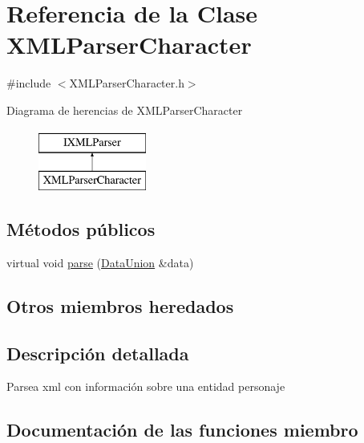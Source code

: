 \hypertarget{classXMLParserCharacter}{}\section{Referencia de la Clase X\+M\+L\+Parser\+Character}
\label{classXMLParserCharacter}


{\ttfamily \#include $<$X\+M\+L\+Parser\+Character.\+h$>$}

Diagrama de herencias de X\+M\+L\+Parser\+Character\begin{figure}[H]
\begin{center}
\leavevmode
\includegraphics[height=2.000000cm]{classXMLParserCharacter}
\end{center}
\end{figure}
\subsection*{Métodos públicos}
\begin{DoxyCompactItemize}
\item 
virtual void \hyperlink{classXMLParserCharacter_af8caeb3dc23d4b4f3b726824e0220782}{parse} (\hyperlink{unionDataUnion}{Data\+Union} \&data)
\end{DoxyCompactItemize}
\subsection*{Otros miembros heredados}


\subsection{Descripción detallada}
Parsea xml con información sobre una entidad personaje 

\subsection{Documentación de las funciones miembro}
\hypertarget{classXMLParserCharacter_af8caeb3dc23d4b4f3b726824e0220782}{}

